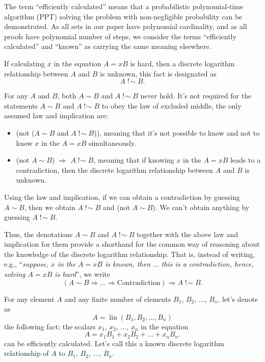 \documentclass{mathcryptology} %
\DeclareMathOperator{\notsim}{!\!\sim}
\DeclareMathOperator{\lin}{lin}
\theoremstyle{title}
\theoremstyle{titleof}
\begin{document}
    The term ``efficiently calculated'' means that a probabilistic polynomial-time algorithm (PPT) solving the problem with non-negligible probability can be demonstrated. As all sets in our paper have polynomial cardinality, and as all proofs have polynomial number of steps, we consider the terms ``efficiently calculated'' and ``known'' as carrying the same meaning elsewhere.

    If calculating $x$ in the equation $A=xB$ is hard, then a discrete logarithm relationship between $A$ and $B$ is unknown, this fact is designated as
    \begin{equation*}
        A\notsim B.
    \end{equation*}

    For any $A$ and $B$, both $A\sim B$ and $A\notsim B$ never hold. It's not required for the statements $A\sim B$ and $A\notsim B$ to obey the law of excluded middle, the only assumed law and implication are:
    \begin{itemize}
        \item (not ($A\sim B$ and $A\notsim B$)), meaning that it's not possible to know and not to know $x$ in the $A=xB$ simultaneously.
        \item (not $A\sim B$) $\Rightarrow$ $A\notsim B$, meaning that if knowing $x$ in the $A=xB$ leads to a contradiction, then the discrete logarithm relationship between $A$ and $B$ is unknown.
    \end{itemize}

    Using the law and implication, if we can obtain a contradiction by guessing $A\sim B$, then we obtain $A\notsim B$ and (not $A\sim B$). We can't obtain anything by guessing $A\notsim B$.

    Thus, the denotations $A\sim B$ and $A\notsim B$ together with the above law and implication for them provide a shorthand for the common way of reasoning about the knowledge of the discrete logarithm relationship. That is, instead of writing, e.g., ``\textit{suppose, $x$ in the $A=xB$ is known, then ${\dots}$ this is a contradiction, hence, solving $A=xB$ is hard}'', we write
    \begin{equation*}
        \left(A\sim B \Rightarrow {\dots} \Rightarrow \text{Contradiction}\right) \Rightarrow A\notsim B.
    \end{equation*}
    
    For any element $A$ and any finite number of elements $B_{1}$, $B_{2}$, ${\dots}$, $B_{n}$, let's denote as
    \begin{equation*}
        A = \lin\left(B_{1}, B_{2}, {\dots}, B_{n}\right)
    \end{equation*}
    the following fact: the scalars $x_{1}$, $x_{2}$, ${\dots}$, $x_{n}$ in the equation
    \begin{equation*}
        A = x_{1} B_{1} + x_{2} B_{2} + {\dots} +x_{n}B_{n}.
    \end{equation*}
    can be efficiently calculated. Let's call this a known discrete logarithm relationship of $A$ to $B_{1}$, $B_{2}$, ${\dots}$, $B_{n}$.
\end{document}
